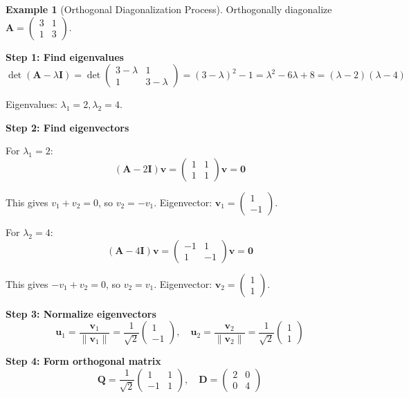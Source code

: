\documentclass[12pt]{article}
\numberwithin{equation}{section}
\newcommand{\vect}[1]{\boldsymbol{#1}}   %
\newcommand{\mat}[1]{\mathbf{#1}}        %
\theoremstyle{plain}
\theoremstyle{definition}
\newtheorem{example}[theorem]{Example}
\theoremstyle{remark}
\begin{document}
\begin{example}[Orthogonal Diagonalization Process]
Orthogonally diagonalize $\mat{A} = \begin{pmatrix} 3 & 1 \\ 1 & 3 \end{pmatrix}$.

\textbf{Step 1: Find eigenvalues}
$$\det(\mat{A} - \lambda\mat{I}) = \det\begin{pmatrix} 3-\lambda & 1 \\ 1 & 3-\lambda \end{pmatrix} = (3-\lambda)^2 - 1 = \lambda^2 - 6\lambda + 8 = (\lambda-2)(\lambda-4)$$

Eigenvalues: $\lambda_1 = 2, \lambda_2 = 4$.

\textbf{Step 2: Find eigenvectors}

For $\lambda_1 = 2$:
$$(\mat{A} - 2\mat{I})\vect{v} = \begin{pmatrix} 1 & 1 \\ 1 & 1 \end{pmatrix}\vect{v} = \vect{0}$$

This gives $v_1 + v_2 = 0$, so $v_2 = -v_1$. Eigenvector: $\vect{v}_1 = \begin{pmatrix} 1 \\ -1 \end{pmatrix}$.

For $\lambda_2 = 4$:
$$(\mat{A} - 4\mat{I})\vect{v} = \begin{pmatrix} -1 & 1 \\ 1 & -1 \end{pmatrix}\vect{v} = \vect{0}$$

This gives $-v_1 + v_2 = 0$, so $v_2 = v_1$. Eigenvector: $\vect{v}_2 = \begin{pmatrix} 1 \\ 1 \end{pmatrix}$.

\textbf{Step 3: Normalize eigenvectors}
$$\vect{u}_1 = \frac{\vect{v}_1}{\|\vect{v}_1\|} = \frac{1}{\sqrt{2}}\begin{pmatrix} 1 \\ -1 \end{pmatrix}, \quad \vect{u}_2 = \frac{\vect{v}_2}{\|\vect{v}_2\|} = \frac{1}{\sqrt{2}}\begin{pmatrix} 1 \\ 1 \end{pmatrix}$$

\textbf{Step 4: Form orthogonal matrix}
$$\mat{Q} = \frac{1}{\sqrt{2}}\begin{pmatrix} 1 & 1 \\ -1 & 1 \end{pmatrix}, \quad \mat{D} = \begin{pmatrix} 2 & 0 \\ 0 & 4 \end{pmatrix}$$


\end{example}
\end{document}

